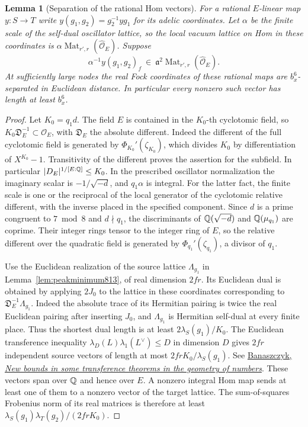 \documentclass[a4paper,11pt]{article}
\newtheorem{lemma}[proposition]{Lemma}
\theoremstyle{definition}
\theoremstyle{remark}
\numberwithin{equation}{section}
\begin{document}
\begin{lemma}[Separation of the rational Hom vectors]
\leavevmode\label{lem:sparsedistance814}
For a rational \(E\)-linear map \(y:S\to T\) write
\(y(g_1,g_2)=g_2^{-1}y g_1\) for its adelic coordinates.
Let \(\alpha\) be the finite scale of the self-dual oscillator
lattice, so the local vacuum lattice on Hom in these
coordinates is \(\alpha\operatorname{Mat}_{r',r}
(\widehat{\mathcal O}_E)\). Suppose
\[
  \alpha^{-1}y(g_1,g_2)_f\ \in\
        \mathfrak a^2\operatorname{Mat}_{r',r}
             (\widehat{\mathcal O}_E).
\]
At sufficiently large nodes the real Fock coordinates of
these rational maps are \(b_x^6\)-separated in Euclidean
distance. In particular every nonzero such vector has
length at least \(b_x^6\).
\end{lemma}
\begin{proof}
Let \(K_0=q_1 d\). The field \(E\) is contained in the
\(K_0\)-th cyclotomic field, so \(K_0\mathfrak D_E^{-1}
\subset\mathcal O_E\), with \(\mathfrak D_E\) the absolute
different. Indeed the different of the full cyclotomic
field is generated by \(\Phi_{K_0}'(\zeta_{K_0})\), which
divides \(K_0\) by differentiation of \(X^{K_0}-1\).
Transitivity of the different proves the assertion for
the subfield. In particular \(|D_E|^{1/[E:\mathbb Q]}\le K_0\).
In the prescribed oscillator normalization the imaginary
scalar is \(-1/\sqrt{-d}\), and \(q_1\alpha\) is integral.
For the latter fact, the finite scale is one or the
reciprocal of the local generator of the cyclotomic relative
different, with the inverse placed in the specified component.
Since \(d\) is a prime congruent to \(7\bmod 8\) and \(d\nmid q_1\), the discriminants of
\(\mathbb Q(\sqrt{-d})\) and \(\mathbb Q(\mu_{q_1})\) are coprime.
Their integer rings tensor to the integer ring of \(E\),
so the relative different over the quadratic field is
generated by \(\Phi_{q_1}'(\zeta_{q_1})\), a divisor of \(q_1\).

Use the Euclidean realization of the source lattice
\(\Lambda_{g_1}\) in Lemma~\ref{lem:peakminimum813}, of
real dimension \(2fr\). Its Euclidean dual is obtained
by applying \(2J_0\) to the lattice in these coordinates
corresponding to \(\mathfrak D_E^{-1}\Lambda_{g_1}\).
Indeed the absolute trace of its Hermitian pairing is
twice the real Euclidean pairing after inserting \(J_0\),
and \(\Lambda_{g_1}\) is Hermitian self-dual at every
finite place. Thus the shortest dual length is at least
\(2\lambda_S(g_1)/K_0\).
The Euclidean transference inequality
\(\lambda_D(L)\lambda_1(L^\vee)\le D\) in dimension \(D\)
gives \(2fr\) independent source vectors of length at
most \(2frK_0/\lambda_S(g_1)\).
See \href{https://doi.org/10.1007/BF01445125}
{Banaszczyk, \emph{New bounds in some transference theorems
in the geometry of numbers}}. These vectors span over
\(\mathbb Q\) and hence over \(E\). A nonzero integral Hom map
sends at least one of them to a nonzero vector of the target
lattice. The sum-of-squares Frobenius norm of its real
matrices is therefore at least
\(\lambda_S(g_1)\lambda_T(g_2)/(2frK_0)\).


\end{proof}
\end{document}

